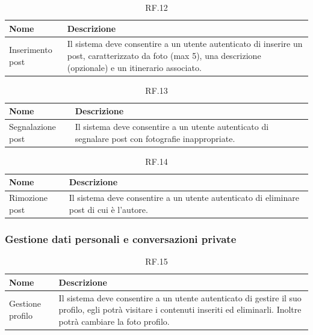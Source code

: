 \documentclass{natourDoc}
\begin{document}
\begin{table}[H]
	\centering
	\begin{tabular}{ |p{5cm}|p{10.3cm}| }
		\hline
		\rowcolor{PineGreen!70}
		\textbf{Nome}    & \textbf{Descrizione}                                                    \\
		\hline
		Inserimento post & Il sistema deve consentire a un utente autenticato di inserire un post,
		caratterizzato da foto (max 5), una descrizione (opzionale) e un itinerario associato.     \\
		\hline
	\end{tabular}
	\caption{RF.12}
	\label{table:12}
\end{table}


\begin{table}[H]
	\centering
	\begin{tabular}{ |p{5cm}|p{10.3cm}| }
		\hline
		\rowcolor{PineGreen!70}
		\textbf{Nome}     & \textbf{Descrizione}                                                                \\
		\hline
		Segnalazione post & Il sistema deve consentire a un utente autenticato di segnalare post con fotografie
		inappropriate.                                                                                          \\
		\hline
	\end{tabular}
	\caption{RF.13}
	\label{table:13}
\end{table}

\begin{table}[H]
	\centering
	\begin{tabular}{ |p{5cm}|p{10.3cm}| }
		\hline
		\rowcolor{PineGreen!70}
		\textbf{Nome}  & \textbf{Descrizione}                                                        \\
		\hline
		Rimozione post & Il sistema deve consentire a un utente autenticato di eliminare post di cui
		è l'autore.                                                                                  \\
		\hline
	\end{tabular}
	\caption{RF.14}
	\label{table:14}
\end{table}

\subsubsection{Gestione dati personali e conversazioni private}
\begin{table}[H]
	\centering
	\begin{tabular}{ |p{5cm}|p{10.3cm}| }
		\hline
		\rowcolor{PineGreen!70}
		\textbf{Nome}    & \textbf{Descrizione}                                                          \\
		\hline
		Gestione profilo & Il sistema deve consentire a un utente autenticato di gestire il suo profilo,
		egli potrà visitare i contenuti inseriti ed eliminarli. Inoltre potrà cambiare la foto profilo.  \\
		\hline
	\end{tabular}
	\caption{RF.15}
	\label{table:15}
\end{table}
\end{document}
